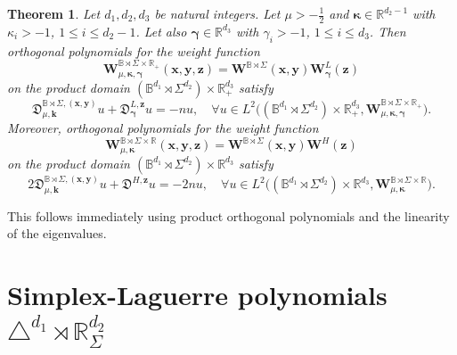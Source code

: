 \documentclass{amsart}
\newtheorem{thm}{Theorem}[section]
\theoremstyle{remark}
\def\fD{{\mathfrak D}}
\def\g{{\gamma}}
\def\k{{\kappa}}
\def\kb{{\bm k}}
\def\xb{{\bm x}}
\def\yb{{\bm y}}
\def\Wb{{\bm W}}
\def\BB{{\mathbb B}}
\def\RR{{\mathbb R}}
\def\bg{{\boldsymbol{\gamma}}}
\def\bk{{\boldsymbol{\kappa}}}
\def\f{\frac}
\begin{document}
\begin{thm} 
Let $d_1, d_2, d_3$ be natural integers. Let $\mu > -\f12$ and $\bk \in \RR^{d_2-1}$ with $\k_i > -1$, 
$1 \le i \le d_2-1$. Let also $\bg \in \RR^{d_3}$ with $\g_i > -1$, $1 \le i \le d_3$. Then orthogonal polynomials 
for the weight function 
$$
\Wb_{\mu,\bk,\bg}^{\BB\rtimes \Sigma \times\RR_+}(\xb,\yb,\bm z) = \Wb^{\BB\rtimes \Sigma}(\xb,\yb)\Wb_\bg^{L}(\bm z)
$$ 
on the product domain $(\BB^{d_1}\rtimes \Sigma^{d_2}) \times\RR_+^{d_3}$ satisfy 
$$
   \fD_{\mu,\kb}^{\BB\rtimes\Sigma, (\xb,\yb)} u  + \fD_\bg^{L, \bm z} u = -  n u,
    \quad \forall u \in L^2\big((\BB^{d_1}\rtimes \Sigma^{d_2}) \times\RR_+^{d_3}, \Wb_{\mu,\bk,\bg}^{\BB\rtimes \Sigma \times\RR_+}\big).
$$
Moreover, orthogonal polynomials for the weight function 
$$
\Wb_{\mu,\bk}^{\BB\rtimes \Sigma \times\RR}(\xb,\yb,\bm z) = \Wb^{\BB\rtimes \Sigma}(\xb,\yb)\Wb^H (\bm z)
$$
on the product domain $(\BB^{d_1}\rtimes \Sigma^{d_2}) \times\RR^{d_3}$ satisfy 
$$
  2 \fD_{\mu,\kb}^{\BB\rtimes\Sigma, (\xb,\yb)} u  + \fD^{H, \bm z} u = - 2 n u,
    \quad \forall u \in L^2\big((\BB^{d_1}\rtimes \Sigma^{d_2}) \times\RR^{d_3}, \Wb_{\mu,\bk}^{\BB\rtimes \Sigma \times\RR}\big).
$$
\end{thm}

This follows immediately using product orthogonal polynomials and the linearity of the eigenvalues. 



\iffalse
\section{Simplex-Laguerre polynomials  $\triangle^{d_1}  \rtimes \RR_\Sigma^{d_2}$}
\setcounter{equation}{0}
\end{document}
